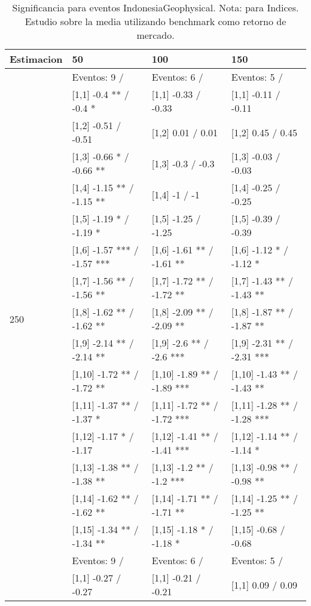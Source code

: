 \begin{table}

\caption{Significancia para eventos IndonesiaGeophysical. Nota: para Indices. Estudio sobre la media utilizando benchmark como retorno de mercado.}
\centering
\begin{tabular}[t]{llll}
\toprule
Estimacion & 50 & 100 & 150\\
\midrule
 & Eventos:  9 / & Eventos:  6 / & Eventos:  5 /\\
 & {}[1,1] -0.4 ** / -0.4 * & {}[1,1] -0.33  / -0.33 & {}[1,1] -0.11  / -0.11\\
 & {}[1,2] -0.51  / -0.51 & {}[1,2] 0.01  / 0.01 & {}[1,2] 0.45  / 0.45\\
 & {}[1,3] -0.66 * / -0.66 ** & {}[1,3] -0.3  / -0.3 & {}[1,3] -0.03  / -0.03\\
 & {}[1,4] -1.15 ** / -1.15 ** & {}[1,4] -1  / -1 & {}[1,4] -0.25  / -0.25\\
\addlinespace
 & {}[1,5] -1.19 * / -1.19 * & {}[1,5] -1.25  / -1.25 & {}[1,5] -0.39  / -0.39\\
 & {}[1,6] -1.57 *** / -1.57 *** & {}[1,6] -1.61 ** / -1.61 ** & {}[1,6] -1.12 * / -1.12 *\\
 & {}[1,7] -1.56 ** / -1.56 ** & {}[1,7] -1.72 ** / -1.72 ** & {}[1,7] -1.43 ** / -1.43 **\\
250 & {}[1,8] -1.62 ** / -1.62 ** & {}[1,8] -2.09 ** / -2.09 ** & {}[1,8] -1.87 ** / -1.87 **\\
 & {}[1,9] -2.14 ** / -2.14 ** & {}[1,9] -2.6 ** / -2.6 *** & {}[1,9] -2.31 ** / -2.31 ***\\
\addlinespace
 & {}[1,10] -1.72 ** / -1.72 ** & {}[1,10] -1.89 ** / -1.89 *** & {}[1,10] -1.43 ** / -1.43 **\\
 & {}[1,11] -1.37 ** / -1.37 * & {}[1,11] -1.72 ** / -1.72 *** & {}[1,11] -1.28 ** / -1.28 ***\\
 & {}[1,12] -1.17 * / -1.17 & {}[1,12] -1.41 ** / -1.41 *** & {}[1,12] -1.14 ** / -1.14 *\\
 & {}[1,13] -1.38 ** / -1.38 ** & {}[1,13] -1.2 ** / -1.2 *** & {}[1,13] -0.98 ** / -0.98 **\\
 & {}[1,14] -1.62 ** / -1.62 ** & {}[1,14] -1.71 ** / -1.71 ** & {}[1,14] -1.25 ** / -1.25 **\\
\addlinespace
 & {}[1,15] -1.34 ** / -1.34 ** & {}[1,15] -1.18 * / -1.18 * & {}[1,15] -0.68  / -0.68\\
 & Eventos:  9 / & Eventos:  6 / & Eventos:  5 /\\
 & {}[1,1] -0.27  / -0.27 & {}[1,1] -0.21  / -0.21 & {}[1,1] 0.09  / 0.09\\

\end{tabular}
\end{table}
